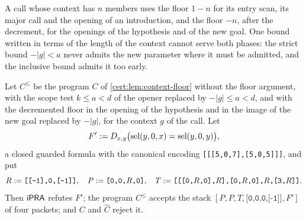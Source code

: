 A call whose context has $n$ members uses the floor $1-n$ for its entry
scan, its major call and the opening of an introduction, and the floor $-n$,
after the decrement, for the openings of the hypothesis and of the new goal.
One bound written in terms of the length of the context cannot serve both
phases: the strict bound $-\lvert g\rvert<a$ never admits the new parameter
where it must be admitted, and the inclusive bound admits it too early.

\begin{proposition}\label{cert:prop:inclusive-floor}
Let $C^{\le}$ be the program $C$ of \cref{cert:lem:context-floor} without
the floor argument, with the scope test $k\le a<d$ of the opener replaced by
$-\lvert g\rvert\le a<d$, and with the decremented floor in the opening of
the hypothesis and in the image of the new goal replaced by
$-\lvert g\rvert$, for the context $g$ of the call. Let
\[
F'\mathrel{:=}D_{x,y}\bigl(\operatorname{sel}(y,0,x)=\operatorname{sel}(y,0,y)\bigr),
\]
a closed guarded formula with the canonical encoding
\texttt{[[[5,0,7],[5,0,5]]]}, and put
\[
R\mathrel{:=}\texttt{[[-1],0,[-1]]},\quad
P\mathrel{:=}\texttt{[0,0,}R\texttt{,0]},\quad
T\mathrel{:=}\texttt{[[[0,}R\texttt{,0],}R\texttt{],[0,}R\texttt{,0],}R\texttt{,[3,}R\texttt{]]}.
\]
Then $\mathsf{iPRA}$ refutes $F'$; the program $C^{\le}$ accepts the stack
$[P,P,T,\texttt{[0,0,0,[-1]]},F']$ of four packets; and $C$ and
$\widehat C$ reject it.
\end{proposition}
